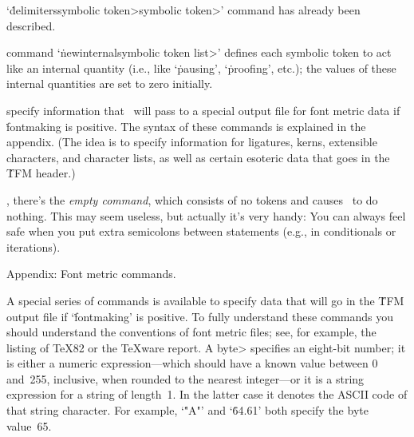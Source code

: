 \@The `\.{delimiters}\<symbolic token>\<symbolic token>' command
has already been described.

\@The command `\.{newinternal}\<symbolic token list>' defines each symbolic
token to act like an internal quantity (i.e., like `\.{pausing}',
`\.{proofing}', etc.); the values of these internal quantities are set to
zero initially.

 specify information that \MF\ will pass
to a special output file for font metric data if \.{fontmaking} is
positive.  The syntax of these commands is explained in the appendix.
(The idea is to specify information for ligatures, kerns, extensible
characters, and character lists, as well as certain esoteric data that
goes in the \.{TFM} header.)

\@Finally, there's the {\it empty command}, which consists
of no tokens and causes \MF\ to do nothing. This may seem useless,
but actually it's very handy: You can always feel safe when you put
extra semicolons between statements (e.g., in conditionals or iterations).

\vfill\eject

\newsection Appendix: Font metric commands.

A special series of commands is available to specify data that will go in
the \.{TFM} output file if `\.{fontmaking}' is positive. To fully
understand these commands you should understand the conventions of font
metric files; see, for example, the listing of \TeX82 or the \TeX ware
report.
A \<byte> specifies an eight-bit number; it is either a numeric
expression---which should have a known value between 0 and~255, inclusive,
when rounded to the nearest integer---or it is a string expression for
a string of length~1. In the latter case it denotes the ASCII code
of that string character. For example, `\.{"A"}' and `\.{64.61}' both
specify the byte value~65.

